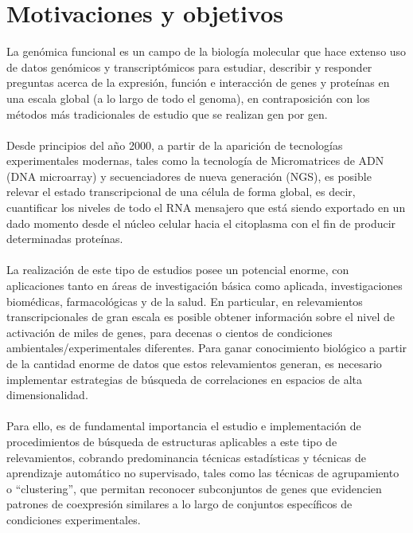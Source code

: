 \chapter*{Motivaciones y objetivos}
La genómica funcional es un campo de la biología molecular que hace extenso uso de datos genómicos y transcriptómicos para estudiar, describir y responder preguntas acerca de la expresión, función e interacción de genes y proteínas en una escala global (a lo largo de todo el genoma), en contraposición con los métodos más tradicionales de estudio que se realizan gen por gen.\\\\
Desde principios del año 2000, a partir de la aparición de tecnologías experimentales modernas, tales como la tecnología de Micromatrices de ADN (DNA microarray) y secuenciadores de nueva generación (NGS), es posible relevar el estado transcripcional de una célula de forma global, es decir, cuantificar los niveles de todo el RNA mensajero que está siendo exportado en un dado momento desde el núcleo celular hacia el citoplasma con el fin de producir determinadas proteínas.\\\\
La realización de este tipo de estudios posee un potencial enorme, con aplicaciones tanto en áreas de investigación básica como aplicada, investigaciones biomédicas, farmacológicas y de la salud. En particular, en relevamientos transcripcionales de gran escala es posible obtener información sobre el nivel de activación de miles de genes, para decenas o cientos de condiciones ambientales/experimentales diferentes. Para ganar conocimiento biológico a partir de la cantidad enorme de datos que estos relevamientos generan, es necesario implementar estrategias de búsqueda de correlaciones en espacios de alta dimensionalidad.\\\\
Para ello, es de fundamental importancia el estudio e implementación de procedimientos de búsqueda de estructuras aplicables a este tipo de relevamientos, cobrando predominancia técnicas estadísticas y técnicas de aprendizaje automático no supervisado, tales como las técnicas de agrupamiento o ``clustering'', que permitan reconocer subconjuntos de genes que evidencien patrones de coexpresión similares a lo largo de conjuntos específicos de condiciones experimentales.\cite{functional_genomics_definition_nature}

